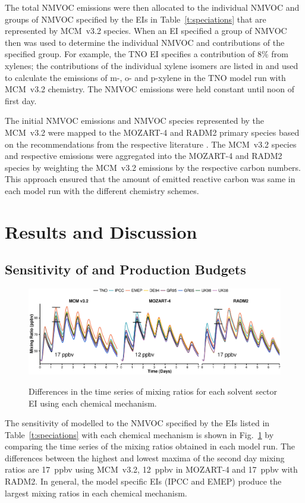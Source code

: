 \documentclass[14pt]{extarticle}
\begin{document}
The total NMVOC emissions were then allocated to the individual NMVOC and groups of NMVOC specified by the EIs in Table~\ref{t:speciations} that are represented by MCM~v3.2 species.
When an EI specified a group of NMVOC then \citet{Passant:2002} was used to determine the individual NMVOC and contributions of the specified group.
For example, the TNO EI specifies a contribution of $8$\% from xylenes; the contributions of the individual xylene isomers are listed in \citet{Passant:2002} and used to calculate the emissions of m-, o- and p-xylene in the TNO model run with MCM~v3.2 chemistry.  
The NMVOC emissions were held constant until noon of first day.

The initial NMVOC emissions and NMVOC species represented by the MCM~v3.2 were mapped to the MOZART-4 and RADM2 primary species based on the recommendations from the respective literature \citep{Emmons:2010, Stockwell:1990}.
The MCM~v3.2 species and respective emissions were aggregated into the MOZART-4 and RADM2 species by weighting the MCM~v3.2 emissions by the respective carbon numbers.
This approach ensured that the amount of emitted reactive carbon was same in each model run with the different chemistry schemes.

\section{Results and Discussion}

\subsection[Sensitivity of O3 and Ox Production Budgets]{Sensitivity of  and  Production Budgets} \label{ss:o3}
\begin{figure}
    \centering
    \caption{Differences in the time series of  mixing ratios for each solvent sector EI using each chemical mechanism.}
    \includegraphics[width=\textwidth]{Scientific_Writing_Course/Pictures/Solvents_Only_O3_mixing_ratios}
    \label{f:O3_time_series}
    \vspace{-2mm}
\end{figure}
The sensitivity of modelled  to the NMVOC specified by the EIs listed in Table~\ref{t:speciations} with each chemical mechanism is shown in Fig.~\ref{f:O3_time_series} by comparing the time series of the  mixing ratios obtained in each model run.
The differences between the highest and lowest maxima of the second day  mixing ratios are 17~ppbv using MCM~v3.2, 12~ppbv in MOZART-4 and 17~ppbv with RADM2.
In general, the model specific EIs (IPCC and EMEP) produce the largest  mixing ratios in each chemical mechanism.
\end{document}
